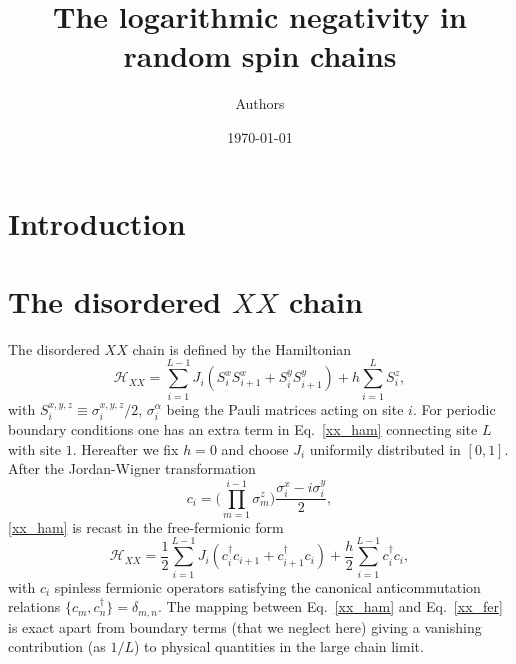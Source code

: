 \documentclass[twocolumn,superscriptaddress,prb,10pt]{revtex4-1}
\begin{document}
\title{The logarithmic negativity in random spin chains} 


\author{Authors}

\date{\today}




\begin{abstract} 


\end{abstract}


\maketitle


\section{Introduction}


\section{The disordered $XX$ chain}
\label{dis-XX}

The disordered $XX$ chain is defined by the Hamiltonian 
%
\begin{equation}
{\mathcal H}_{XX}=\sum\limits_{i=1}^{L-1}J_i(S^x_iS^x_{i+1}+S^y_i
S^y_{i+1})+h\sum\limits_{i=1}^{L}S_i^z, 
\label{xx_ham}
\end{equation}
%
with $S^{x,y,z}_i\equiv\sigma_i^{x,y,z}/2$, $\sigma_i^\alpha$ 
being the Pauli matrices acting on site $i$. For periodic 
boundary conditions one has an extra term in Eq.~\eqref{xx_ham} 
connecting site $L$ with site $1$. Hereafter we fix $h=0$ and 
choose $J_i$ uniformily distributed in $[0,1]$. After the Jordan-Wigner 
transformation 
%
\begin{equation}
c_i=\Big(\prod\limits_{m=1}^{i-1}\sigma^z_m\Big)
\frac{\sigma_i^x-i\sigma_i^y}{2},
\label{j-wigner}
\end{equation}
%
\eqref{xx_ham} is recast in the free-fermionic form 
%
\begin{equation}
{\mathcal H}_{XX}=\frac{1}{2}\sum\limits_{i=1}^{L-1}J_i(c^\dagger_i 
c_{i+1}+c^\dagger_{i+1}c_i)+\frac{h}{2}\sum\limits_{i=1}^{L-1}
c^\dagger_i c_i,
\label{xx_fer}
\end{equation}
%
with $c_i$ spinless fermionic operators satisfying the canonical 
anticommutation relations $\{c_m,c^\dagger_n\}=\delta_{m,n}$. 
The mapping between Eq.~\eqref{xx_ham} and Eq.~\eqref{xx_fer} 
is exact apart from boundary terms (that we neglect here) giving a 
vanishing contribution (as $1/L$) to physical quantities in the  large 
chain limit. 
\end{document}
